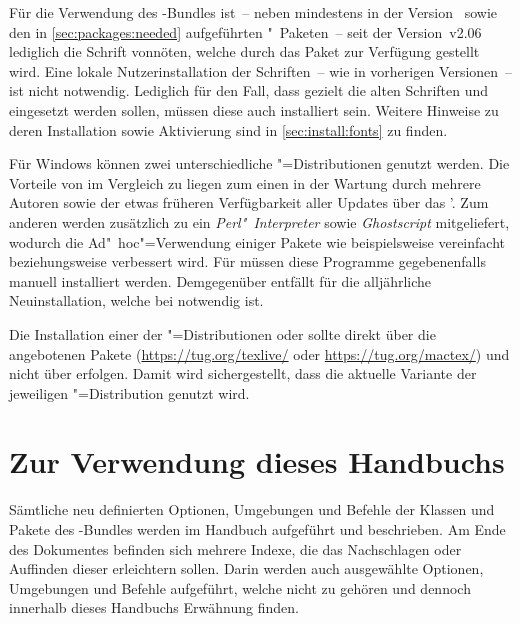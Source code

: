 Für die Verwendung des \TUDScript-Bundles ist~-- neben \KOMAScript{} mindestens 
in der Version~\vKOMAScript{} sowie den in \autoref{sec:packages:needed} 
aufgeführten "~Paketen~-- seit der Version~v2.06 lediglich die 
Schrift \OpenSans vonnöten, welche durch das Paket  zur 
Verfügung gestellt wird. Eine lokale Nutzerinstallation der Schriften~-- wie in 
vorherigen Versionen~-- ist nicht notwendig. Lediglich für den Fall, dass 
gezielt die alten Schriften \Univers und \DIN eingesetzt werden sollen, müssen 
diese auch installiert sein. Weitere Hinweise zu deren Installation sowie 
Aktivierung sind in \autoref{sec:install:fonts} zu finden.

%
Für Windows können zwei unterschiedliche "=Distributionen genutzt 
werden. Die Vorteile von  im Vergleich zu 
 liegen zum einen in der Wartung durch mehrere 
Autoren sowie der etwas früheren Verfügbarkeit aller Updates über das \CTAN'. 
Zum anderen werden zusätzlich zu  ein \emph{Perl"~Interpreter} 
sowie \emph{Ghostscript} mitgeliefert, wodurch die Ad"~hoc"=Verwendung einiger 
Pakete wie beispielsweise  vereinfacht beziehungsweise 
verbessert wird. Für  müssen diese Programme 
gegebenenfalls manuell installiert werden. Demgegenüber entfällt für 
 die alljährliche Neuinstallation, welche bei 
 notwendig ist.

%
Die Installation einer der "=Distributionen 
 oder  sollte 
direkt über die angebotenen Pakete (\url{https://tug.org/texlive/} oder 
\url{https://tug.org/mactex/}) und nicht über  erfolgen. 
Damit wird sichergestellt, dass die aktuelle Variante der jeweiligen 
"=Distribution genutzt wird.



\section{Zur Verwendung dieses Handbuchs}
%
%
%
%
Sämtliche neu definierten Optionen, Umgebungen und Befehle der Klassen und 
Pakete des \TUDScript-Bundles werden im Handbuch aufgeführt und beschrieben. Am 
Ende des Dokumentes befinden sich mehrere Indexe, die das Nachschlagen oder 
Auffinden dieser erleichtern sollen. Darin werden auch ausgewählte Optionen, 
Umgebungen und Befehle aufgeführt, welche nicht zu \TUDScript gehören und 
dennoch innerhalb dieses Handbuchs Erwähnung finden.

